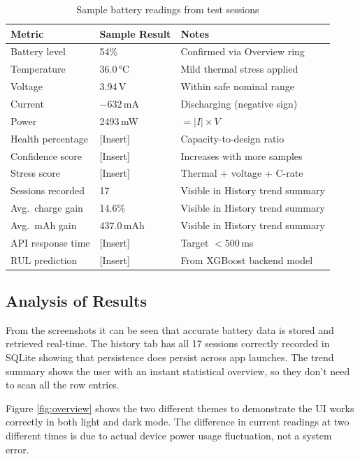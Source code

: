 \documentclass[12pt,a4paper]{report}
\begin{document}
\begin{table}[H]
\caption{Sample battery readings from test sessions}
\centering
\small
\begin{tabular}{lll}
\toprule
\textbf{Metric} & \textbf{Sample Result} & \textbf{Notes}\\
\midrule
Battery level       & 54\%       & Confirmed via Overview ring\\
Temperature         & 36.0\,°C   & Mild thermal stress applied\\
Voltage             & 3.94\,V    & Within safe nominal range\\
Current             & $-632$\,mA & Discharging (negative sign)\\
Power               & 2493\,mW   & $= |I| \times V$\\
Health percentage   & [Insert]   & Capacity-to-design ratio\\
Confidence score    & [Insert]   & Increases with more samples\\
Stress score        & [Insert]   & Thermal + voltage + C-rate\\
Sessions recorded   & 17         & Visible in History trend summary\\
Avg.\ charge gain   & 14.6\%     & Visible in History trend summary\\
Avg.\ mAh gain      & 437.0\,mAh & Visible in History trend summary\\
API response time   & [Insert]   & Target $<500$\,ms\\
RUL prediction      & [Insert]   & From XGBoost backend model\\
\bottomrule
\end{tabular}
\end{table}

\subsection{Analysis of Results}

From the screenshots it can be seen that accurate battery data is stored and retrieved real-time. The history tab has all 17 sessions correctly recorded in SQLite showing that persistence does persist across app launches. The trend summary shows the user with an instant statistical overview, so they don't need to scan all the row entries.

Figure \ref{fig:overview} shows the two different themes to demonstrate the UI works correctly in both light and dark mode. The difference in current readings at two different times is due to actual device power usage fluctuation, not a system error.
\end{document}

